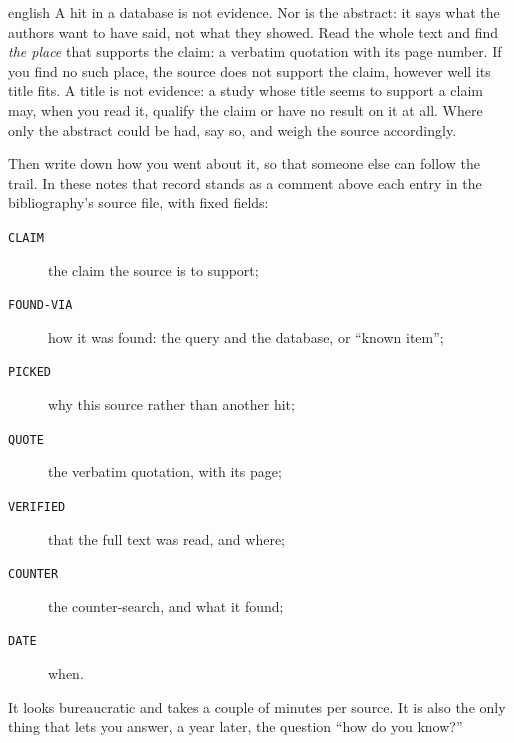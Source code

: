 \begin{onlyin}{english} %
A hit in a database is not evidence.  Nor is the abstract: it says what
the authors want to have said, not what they showed.  Read the whole
text and find \emph{the place} that supports the claim: a verbatim
quotation with its page number.  If you find no such place, the source
does not support the claim, however well its title fits.  A title is
not evidence: a study whose title seems to support a claim may, when you
read it, qualify the claim or have no result on it at all.  Where only
the abstract could be had, say so, and weigh the source accordingly.

Then write down how you went about it, so that someone else can follow
the trail.  In these notes that record stands as a comment above each
entry in the bibliography's source file, with fixed fields:
\begin{description}
  \item[\texttt{CLAIM}] the claim the source is to support;
  \item[\texttt{FOUND-VIA}] how it was found: the query and the
    database, or \enquote{known item};
  \item[\texttt{PICKED}] why this source rather than another hit;
  \item[\texttt{QUOTE}] the verbatim quotation, with its page;
  \item[\texttt{VERIFIED}] that the full text was read, and where;
  \item[\texttt{COUNTER}] the counter-search, and what it found;
  \item[\texttt{DATE}] when.
\end{description}
It looks bureaucratic and takes a couple of minutes per source.  It is
also the only thing that lets you answer, a year later, the question
\enquote{how do you know?}
\end{onlyin}
